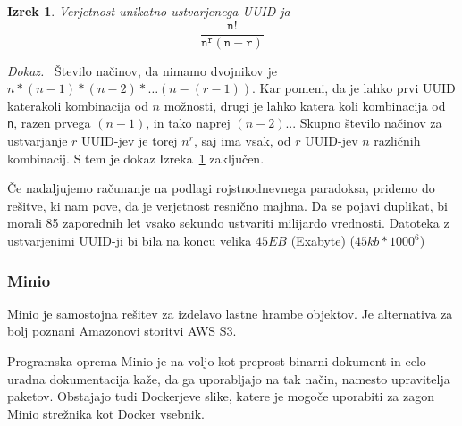 \documentclass[a4paper, 12pt]{book}
\newtheorem{izrek}{Izrek}[chapter]
\newenvironment{dokaz}{\emph{Dokaz.}\ }{\hspace{\fill}{$\Box$}}
\begin{document}
\begin{izrek}
\label{iz:1}
Verjetnost unikatno ustvarjenega UUID-ja
\begin{equation}
\mathtt{\frac{n!}{n^{r}(n-r)}}
\label{eq:1}
\end{equation}
\end{izrek}

\begin{dokaz}
Število načinov, da nimamo dvojnikov je $n*(n-1)*(n-2)* …(n-(r-1))$. Kar pomeni, da je lahko prvi UUID katerakoli kombinacija od $n$ možnosti, drugi je lahko katera koli kombinacija od \verb=n=, razen prvega $(n-1)$, in tako naprej $(n-2)$... Skupno število načinov za ustvarjanje $r$ UUID-jev je torej $n^r$, saj ima vsak, od $r$ UUID-jev $n$ različnih kombinacij.
S tem je dokaz Izreka~\ref{iz:1} zaključen.
\end{dokaz}

Če nadaljujemo računanje na podlagi rojstnodnevnega paradoksa, pridemo do rešitve, ki nam pove, da je verjetnost resnično majhna. Da se pojavi duplikat, bi morali 85 zaporednih let vsako sekundo ustvariti milijardo vrednosti. Datoteka z ustvarjenimi UUID-ji bi bila na koncu velika $45EB$ (Exabyte) ($45kb*1000^6$) \cite{uuid-collisions}






\subsubsection{Minio}
\label{minio-what}
Minio je samostojna rešitev za izdelavo lastne hrambe objektov. Je alternativa za bolj poznani Amazonovi storitvi AWS S3.

Programska oprema Minio je na voljo kot preprost binarni dokument in celo uradna dokumentacija kaže, da ga uporabljajo na tak način, namesto upravitelja paketov. Obstajajo tudi Dockerjeve slike, katere je mogoče uporabiti za zagon Minio strežnika kot Docker vsebnik.
\end{document}
